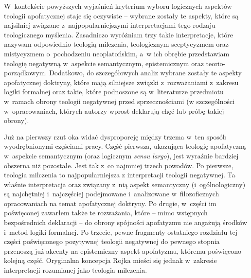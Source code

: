 W~kontekście powyższych wyjaśnień kryterium wyboru logicznych aspektów teologii apofatycznej staje się oczywiste -- wybrane zostały te aspekty, które są najsilniej związane z~najpopularniejszymi interpretacjami tego rodzaju teologicznego myślenia. Zasadniczo wyróżniam trzy takie interpretacje, które nazywam odpowiednio teologią milczenia, teologicznym sceptycyzmem oraz mistycyzmem o~pochodzeniu neoplatońskim, a~w ich obrębie przedstawiam teologię negatywną w~aspekcie semantycznym, epistemicznym oraz teorio-porządkowym. Dodatkowo, do szczegółowych analiz wybrane zostały te aspekty apofatycznej doktryny, które mają silniejsze związki z~rozważaniami z~zakresu logiki formalnej oraz takie, które podnoszone są w~literaturze przedmiotu w~ramach obrony teologii negatywnej przed sprzecznościami (w szczególności w~opracowaniach, których autorzy wprost deklarują chęć lub próbę takiej obrony).

Już na pierwszy rzut oka widać dysproporcję między trzema w~ten sposób wyodrębnionymi częściami pracy. Część pierwsza, ukazująca teologię apofatyczną w~aspekcie semantycznym (oraz logicznym \textit{sensu largo}), jest wyraźnie bardziej obszerna niż pozostałe. Jest tak z~co najmniej trzech powodów. Po pierwsze,
teologia milczenia to najpopularniejsza z interpretacji teologii negatywnej.
Ta właśnie interpretacja oraz związany z~nią aspekt semantyczny (i~ogólnologiczny) są najchętniej i~najczęściej podejmowane i~analizowane w~filozoficznych opracowaniach na temat apofatycznej doktryny. Po drugie, w~części im poświęconej zawarłem także te rozważania, które -- mimo wstępnych bezpośrednich deklaracji -- do obrony spójności apofatyzmu nie angażują środków i~metod logiki formalnej. Po trzecie, pewne fragmenty ostatniego rozdziału tej części poświęconego pozytywnej teologii negatywnej do pewnego stopnia przenoszą już akcenty na epistemiczny aspekt apofatyzmu, któremu poświęcono kolejną część. Oryginalna koncepcja Rojka mieści się jednak w~zakresie interpretacji rozumianej jako teologia milczenia.

